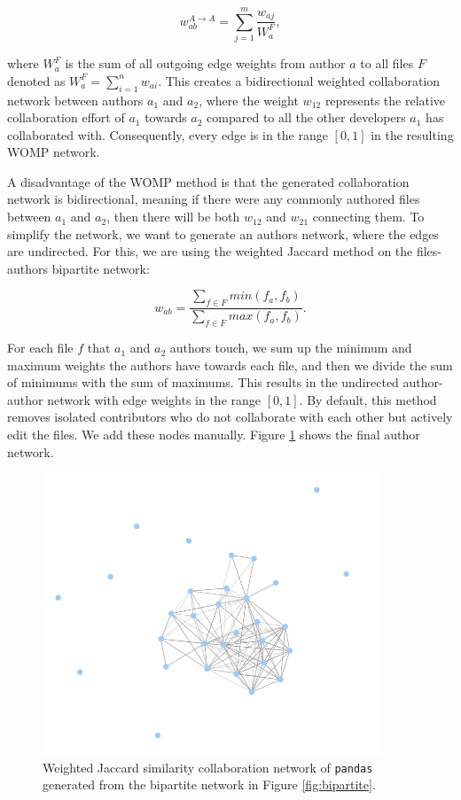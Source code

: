 \[ w_{ab}^{A \rightarrow A} = \sum_{j=1}^m \frac{w_{aj}}{W_a^F}, \]

where $W_a^F$ is the sum of all outgoing edge weights from author $a$ to all files $F$ denoted as $W_a^F = \sum_{i=1}^n w_{ai}$. This creates a bidirectional weighted collaboration network between authors $a_1$ and $a_2$, where the weight $w_{12}$ represents the relative collaboration effort of $a_1$ towards $a_2$ compared to all the other developers $a_1$ has collaborated with. Consequently, every edge is in the range $[0,1]$ in the resulting WOMP network.

A disadvantage of the WOMP method is that the generated collaboration network is bidirectional, meaning if there were any commonly authored files between $a_1$ and $a_2$, then there will be both $w_{12}$ and $w_{21}$ connecting them. To simplify the network, we want to generate an authors network, where the edges are undirected. For this, we are using the weighted Jaccard method on the files-authors bipartite network:

\[ w_{ab} = \frac{\sum_{f \in F}min(f_a, f_b)}{\sum_{f \in F}max(f_a, f_b)}. \]

For each file $f$ that $a_1$ and $a_2$ authors touch, we sum up the minimum and maximum weights the authors have towards each file, and then we divide the sum of minimums with the sum of maximums. This results in the undirected author-author network with edge weights in the range $[0, 1]$. By default, this method removes isolated contributors who do not collaborate with each other but actively edit the files. We add these nodes manually. Figure \ref{fig:jaccard} shows the final author network.

\begin{figure}
    \centering
    \includegraphics[width=0.9\textwidth]{figures/jaccard.png}
    \caption{Weighted Jaccard similarity collaboration network of \texttt{pandas} generated from the bipartite network in Figure \ref{fig:bipartite}.}
    \label{fig:jaccard}
\end{figure}


